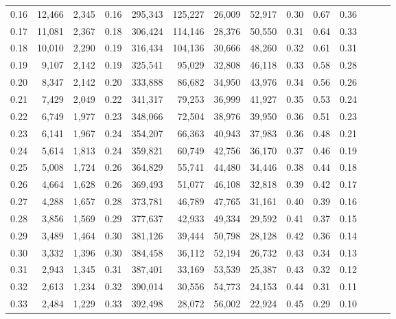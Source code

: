 \begin{tabular}{rrrrrrrrrrrrrr}
0.16 &  12,466 &  2,345 &  0.16 &  295,343 &  125,227 &  26,009 &  52,917 &  0.30 &  0.67 &      0.36 \\
0.17 &  11,081 &  2,367 &  0.18 &  306,424 &  114,146 &  28,376 &  50,550 &  0.31 &  0.64 &      0.33 \\
0.18 &  10,010 &  2,290 &  0.19 &  316,434 &  104,136 &  30,666 &  48,260 &  0.32 &  0.61 &      0.31 \\
0.19 &   9,107 &  2,142 &  0.19 &  325,541 &   95,029 &  32,808 &  46,118 &  0.33 &  0.58 &      0.28 \\
0.20 &   8,347 &  2,142 &  0.20 &  333,888 &   86,682 &  34,950 &  43,976 &  0.34 &  0.56 &      0.26 \\
0.21 &   7,429 &  2,049 &  0.22 &  341,317 &   79,253 &  36,999 &  41,927 &  0.35 &  0.53 &      0.24 \\
0.22 &   6,749 &  1,977 &  0.23 &  348,066 &   72,504 &  38,976 &  39,950 &  0.36 &  0.51 &      0.23 \\
0.23 &   6,141 &  1,967 &  0.24 &  354,207 &   66,363 &  40,943 &  37,983 &  0.36 &  0.48 &      0.21 \\
0.24 &   5,614 &  1,813 &  0.24 &  359,821 &   60,749 &  42,756 &  36,170 &  0.37 &  0.46 &      0.19 \\
0.25 &   5,008 &  1,724 &  0.26 &  364,829 &   55,741 &  44,480 &  34,446 &  0.38 &  0.44 &      0.18 \\
0.26 &   4,664 &  1,628 &  0.26 &  369,493 &   51,077 &  46,108 &  32,818 &  0.39 &  0.42 &      0.17 \\
0.27 &   4,288 &  1,657 &  0.28 &  373,781 &   46,789 &  47,765 &  31,161 &  0.40 &  0.39 &      0.16 \\
0.28 &   3,856 &  1,569 &  0.29 &  377,637 &   42,933 &  49,334 &  29,592 &  0.41 &  0.37 &      0.15 \\
0.29 &   3,489 &  1,464 &  0.30 &  381,126 &   39,444 &  50,798 &  28,128 &  0.42 &  0.36 &      0.14 \\
0.30 &   3,332 &  1,396 &  0.30 &  384,458 &   36,112 &  52,194 &  26,732 &  0.43 &  0.34 &      0.13 \\
0.31 &   2,943 &  1,345 &  0.31 &  387,401 &   33,169 &  53,539 &  25,387 &  0.43 &  0.32 &      0.12 \\
0.32 &   2,613 &  1,234 &  0.32 &  390,014 &   30,556 &  54,773 &  24,153 &  0.44 &  0.31 &      0.11 \\
0.33 &   2,484 &  1,229 &  0.33 &  392,498 &   28,072 &  56,002 &  22,924 &  0.45 &  0.29 &      0.10 \\

\end{tabular}
